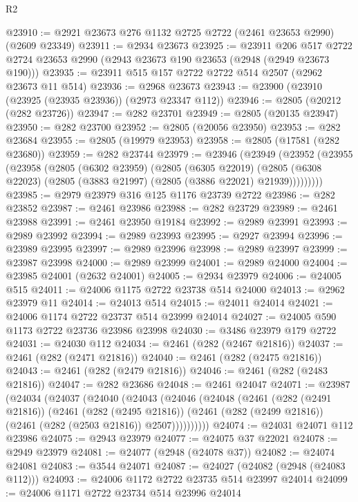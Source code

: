\begin{lexlean}{R2}
\begin{coremodule}
@23910 := @2921 @23673 @276 @1132 @2725 @2722 (@2461 @23653 @2990) (@2609 @23349)
@23911 := @2934 @23673
@23925 := @23911
    @206
    @517
    @2722
    @2724
    @23653
    @2990
    (@2943 @23673 @190 @23653 (@2948 (@2949 @23673 @190)))
@23935 := @23911 @515 @157 @2722 @2722 @514 @2507 (@2962 @23673 @11 @514)
@23936 := @2968 @23673
@23943 := @23900 (@23910 (@23925 (@23935 @23936)) (@2973 @23347 @112))
@23946 := @2805 (@20212 (@282 @23726))
@23947 := @282 @23701
@23949 := @2805 (@20135 @23947)
@23950 := @282 @23700
@23952 := @2805 (@20056 @23950)
@23953 := @282 @23684
@23955 := @2805 (@19979 @23953)
@23958 := @2805 (@17581 (@282 @23680))
@23959 := @282 @23744
@23979 := @23946
    (@23949
      (@23952
        (@23955
          (@23958
            (@2805
              (@6302 @23959)
              (@2805
                (@6305 @22019)
                (@2805 (@6308 @22023) (@2805 (@3883 @21997) (@2805 (@3886 @22021) @21939)))))))))
@23985 := @2979 @23979 @316 @125 @1176 @23739 @2722
@23986 := @282 @23852
@23987 := @2461 @23986
@23988 := @282 @23729
@23989 := @2461 @23988
@23991 := @2461 @23950 @19184
@23992 := @2989 @23991
@23993 := @2989 @23992
@23994 := @2989 @23993
@23995 := @2927 @23994
@23996 := @23989 @23995
@23997 := @2989 @23996
@23998 := @2989 @23997
@23999 := @23987 @23998
@24000 := @2989 @23999
@24001 := @2989 @24000
@24004 := @23985 @24001 (@2632 @24001)
@24005 := @2934 @23979
@24006 := @24005 @515
@24011 := @24006 @1175 @2722 @23738 @514 @24000
@24013 := @2962 @23979 @11
@24014 := @24013 @514
@24015 := @24011 @24014
@24021 := @24006 @1174 @2722 @23737 @514 @23999 @24014
@24027 := @24005 @590 @1173 @2722 @23736 @23986 @23998
@24030 := @3486 @23979 @179 @2722
@24031 := @24030 @112
@24034 := @2461 (@282 (@2467 @21816))
@24037 := @2461 (@282 (@2471 @21816))
@24040 := @2461 (@282 (@2475 @21816))
@24043 := @2461 (@282 (@2479 @21816))
@24046 := @2461 (@282 (@2483 @21816))
@24047 := @282 @23686
@24048 := @2461 @24047
@24071 := @23987
    (@24034
      (@24037
        (@24040
          (@24043
            (@24046
              (@24048
                (@2461
                  (@282 (@2491 @21816))
                  (@2461
                    (@282 (@2495 @21816))
                    (@2461 (@282 (@2499 @21816)) (@2461 (@282 (@2503 @21816)) @2507))))))))))
@24074 := @24031 @24071 @112 @23986
@24075 := @2943 @23979
@24077 := @24075 @37 @22021
@24078 := @2949 @23979
@24081 := @24077 (@2948 (@24078 @37))
@24082 := @24074 @24081
@24083 := @3544 @24071
@24087 := @24027 (@24082 (@2948 (@24083 @112)))
@24093 := @24006 @1172 @2722 @23735 @514 @23997 @24014
@24099 := @24006 @1171 @2722 @23734 @514 @23996 @24014

\end{coremodule}
\end{lexlean}
